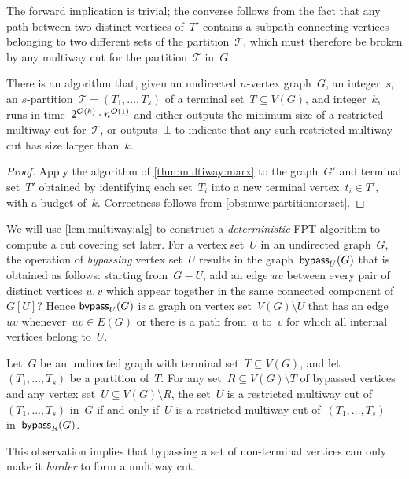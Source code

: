The forward implication is trivial; the converse follows from the fact that any path between two distinct vertices of~$T'$ contains a subpath connecting vertices belonging to two different sets of the partition~$\mathcal{T}$, which must therefore be broken by any multiway cut for the partition~$\mathcal{T}$ in~$G$.

\begin{lemma} \label{lem:multiway:alg}
There is an algorithm that, given an undirected $n$-vertex graph~$G$, an integer~$s$, an $s$-partition~$\mathcal{T} = (T_1, \ldots, T_s)$ of a terminal set~$T \subseteq V(G)$, and integer~$k$, runs in time~$2^{\mathcal{O}(k)} \cdot n^{\mathcal{O}(1)}$ and either outputs the minimum size of a restricted multiway cut for~$\mathcal{T}$, or outputs~$\bot$ to indicate that any such restricted multiway cut has size larger than~$k$. 
\end{lemma}
\begin{proof}
Apply the algorithm of \cref{thm:multiway:marx} to the graph~$G'$ and terminal set~$T'$ obtained by identifying each set~$T_i$ into a new terminal vertex~$t_i \in T'$, with a budget of~$k$. Correctness follows from \cref{obs:mwc:partition:or:set}.
\end{proof}

We will use \cref{lem:multiway:alg} to construct a \emph{deterministic} FPT-algorithm to compute a cut covering set later. For a vertex set~$U$ in an undirected graph~$G$, the operation of \emph{bypassing} vertex set~$U$ results in the graph~$\mathsf{bypass}_U(G)$ that is obtained as follows: starting from~$G - U$, add an edge $uv$ between every pair of distinct vertices $u,v$ which appear together in the same connected component of $G[U]$? Hence $\mathsf{bypass}_U(G)$ is a graph on vertex set~$V(G) \setminus U$ that has an edge~$uv$ whenever~$uv \in E(G)$ or there is a path from~$u$ to~$v$ for which all internal vertices belong to~$U$.
	
	\begin{observation} \label{obs:multiway:bypass}
		Let~$G$ be an undirected graph with terminal set~$T \subseteq V(G)$, and let~$(T_1, \ldots, T_s)$ be a partition of~$T$. For any set~$R \subseteq V(G) \setminus T$ of bypassed vertices and any vertex set~$U \subseteq V(G) \setminus R$, the set~$U$ is a restricted multiway cut of~$(T_1, \ldots, T_s)$ in~$G$ if and only if~$U$ is a restricted multiway cut of~$(T_1, \ldots, T_s)$ in~$\mathsf{bypass}_R(G)$.
	\end{observation}
	
	This observation implies that bypassing a set of non-terminal vertices can only make it \emph{harder} to form a multiway cut. 
	
